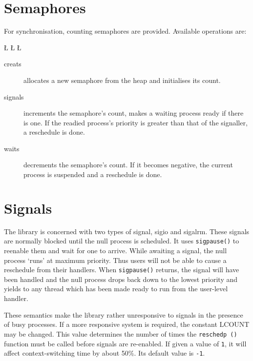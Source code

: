 \section{Semaphores}
For synchronisation, counting semaphores are provided.  Available
operations are:
\begin{tgrind}
\L{\LB{}}
\L{\LB{}}
\L{\LB{}}
\end{tgrind}
\begin{description}
\item[creats] allocates a new semaphore from the heap and initialises its
count.
\item[signals] increments the semaphore's count, makes a waiting process
ready if there is one.  If the readied process's priority is greater than
that of the signaller, a reschedule is done.
\item[waits] decrements the semaphore's count.  If it becomes negative,
the current process is suspended and a reschedule is done.
\end{description}

\section{Signals}
The library is concerned with two types of signal, {\sc sigio} and {\sc
sigalrm}.  These signals are normally blocked until the null process is
scheduled.  It uses {\tt sigpause()} to reenable them and wait for one
to arrive.  While awaiting a signal, the null process `runs' at maximum
priority.  Thus users will not be able to cause a reschedule from
their handlers.  When {\tt sigpause()} returns, the signal will have
been handled and the null process drops back down to the lowest priority
and yields to any thread which has been made ready to run from the
user-level handler.

These semantics make the library rather unresponsive to signals in the
presence of busy processes.  If a more responsive system is required,
the constant {\sc LCOUNT} may be changed.  This value determines the
number of times the {\tt reschedp ()} function must be called before
signals are re-enabled.  If given a value of {\tt 1}, it will affect
context-switching time by about 50\%.  Its default value is {\tt -1}.

